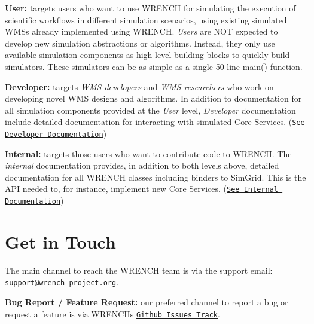 {\bfseries User\+:} targets users who want to use W\+R\+E\+N\+CH for simulating the execution of scientific workflows in different simulation scenarios, using existing simulated W\+M\+Ss already implemented using W\+R\+E\+N\+CH. {\itshape Users} are N\+OT expected to develop new simulation abstractions or algorithms. Instead, they only use available simulation components as high-\/level building blocks to quickly build simulators. These simulators can be as simple as a single 50-\/line main() function.

{\bfseries Developer\+:} targets {\itshape W\+MS developers} and {\itshape W\+MS researchers} who work on developing novel W\+MS designs and algorithms. In addition to documentation for all simulation components provided at the {\itshape User} level, {\itshape Developer} documentation include detailed documentation for interacting with simulated Core Services. (\href{../developer/index.html}{\tt See Developer Documentation})

{\bfseries Internal\+:} targets those users who want to contribute code to W\+R\+E\+N\+CH. The {\itshape internal} documentation provides, in addition to both levels above, detailed documentation for all W\+R\+E\+N\+CH classes including binders to Sim\+Grid. This is the A\+PI needed to, for instance, implement new Core Services. (\href{../internal/index.html}{\tt See Internal Documentation})\hypertarget{index_overview-contact}{}\section{Get in Touch}\label{index_overview-contact}
The main channel to reach the W\+R\+E\+N\+CH team is via the support email\+: \href{mailto:support@wrench-project.org?subject=WRENCH Support Contact: Your Topic}{\tt support@wrench-\/project.\+org}.

{\bfseries Bug Report / Feature Request\+:} our preferred channel to report a bug or request a feature is via W\+R\+E\+N\+CH\textquotesingle{}s \href{https://github.com/wrench-project/wrench/issues}{\tt Github Issues Track}. 